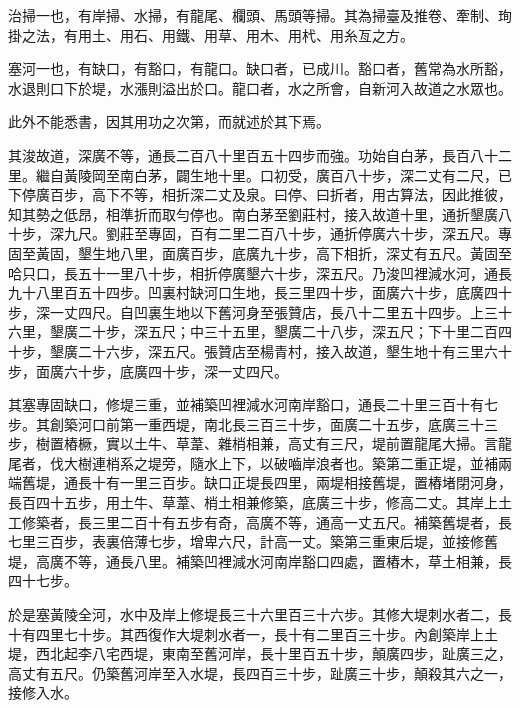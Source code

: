 \begin{pinyinscope}
 治掃一也，有岸掃、水掃，有龍尾、欄頭、馬頭等掃。其為掃臺及推卷、牽制、珣掛之法，有用土、用石、用鐵、用草、用木、用杙、用糸亙之方。



 塞河一也，有缺口，有豁口，有龍口。缺口者，已成川。豁口者，舊常為水所豁，水退則口下於堤，水漲則溢出於口。龍口者，水之所會，自新河入故道之水眾也。



 此外不能悉書，因其用功之次第，而就述於其下焉。



 其浚故道，深廣不等，通長二百八十里百五十四步而強。功始自白茅，長百八十二里。繼自黃陵岡至南白茅，闢生地十里。口初受，廣百八十步，深二丈有二尺，已下停廣百步，高下不等，相折深二丈及泉。曰停、曰折者，用古算法，因此推彼，知其勢之低昂，相準折而取勻停也。南白茅至劉莊村，接入故道十里，通折墾廣八十步，深九尺。劉莊至專固，百有二里二百八十步，通折停廣六十步，深五尺。專固至黃固，墾生地八里，面廣百步，底廣九十步，高下相折，深丈有五尺。黃固至哈只口，長五十一里八十步，相折停廣墾六十步，深五尺。乃浚凹裡減水河，通長九十八里百五十四步。凹裏村缺河口生地，長三里四十步，面廣六十步，底廣四十步，深一丈四尺。自凹裏生地以下舊河身至張贊店，長八十二里五十四步。上三十六里，墾廣二十步，深五尺；中三十五里，墾廣二十八步，深五尺；下十里二百四十步，墾廣二十六步，深五尺。張贊店至楊青村，接入故道，墾生地十有三里六十步，面廣六十步，底廣四十步，深一丈四尺。



 其塞專固缺口，修堤三重，並補築凹裡減水河南岸豁口，通長二十里三百十有七步。其創築河口前第一重西堤，南北長三百三十步，面廣二十五步，底廣三十三步，樹置樁橛，實以土牛、草葦、雜梢相兼，高丈有三尺，堤前置龍尾大掃。言龍尾者，伐大樹連梢系之堤旁，隨水上下，以破嚙岸浪者也。築第二重正堤，並補兩端舊堤，通長十有一里三百步。缺口正堤長四里，兩堤相接舊堤，置樁堵閉河身，長百四十五步，用土牛、草葦、梢土相兼修築，底廣三十步，修高二丈。其岸上土工修築者，長三里二百十有五步有奇，高廣不等，通高一丈五尺。補築舊堤者，長七里三百步，表裏倍薄七步，增卑六尺，計高一丈。築第三重東后堤，並接修舊堤，高廣不等，通長八里。補築凹裡減水河南岸豁口四處，置樁木，草土相兼，長四十七步。



 於是塞黃陵全河，水中及岸上修堤長三十六里百三十六步。其修大堤刺水者二，長十有四里七十步。其西復作大堤刺水者一，長十有二里百三十步。內創築岸上土堤，西北起李八宅西堤，東南至舊河岸，長十里百五十步，顛廣四步，趾廣三之，高丈有五尺。仍築舊河岸至入水堤，長四百三十步，趾廣三十步，顛殺其六之一，接修入水。




\end{pinyinscope}
